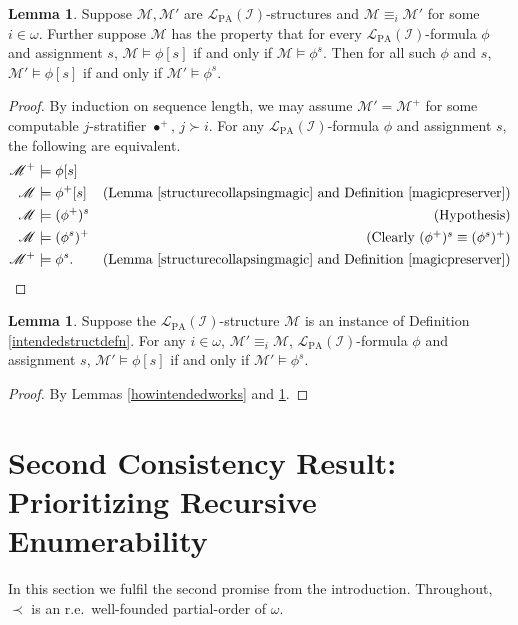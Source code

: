 \documentclass[reqno]{article}
\theoremstyle{definition}
\newtheorem{lemma}[theorem]{Lemma}
\def\L{\mathscr{L}}
\def\M{\mathscr{M}}
\def\LPA{\L_{\mathrm{PA}}}
\def\indset{\mathcal I}
\def\myequiv{\equiv}
\begin{document}
\begin{lemma}
\label{preservedintent}
Suppose $\M,\M'$ are $\LPA(\indset)$-structures
and $\M\myequiv_i\M'$ for some $i\in\omega$.
Further suppose $\M$ has the property that
for every $\LPA(\indset)$-formula $\phi$ and assignment $s$,
$\M\models\phi[s]$ if and only if $\M\models\phi^s$.
Then for all such $\phi$ and $s$,
$\M'\models\phi[s]$ if and only if $\M'\models\phi^s$.
\end{lemma}

\begin{proof}
By induction on sequence length,
we may assume $\M'=\M^+$ for some computable $j$-stratifier $\bullet^+$,
$j\succ i$.
For any $\LPA(\indset)$-formula $\phi$ and assignment $s$,
the following are equivalent.
\begin{align*}
\M^+ &\models \phi[s]\\
\M &\models \phi^+[s]
  &\mbox{(Lemma \ref{structurecollapsingmagic} and Definition \ref{magicpreserver})}\\
\M &\models (\phi^+)^s
  &\mbox{(Hypothesis)}\\
\M &\models (\phi^s)^+
  &\mbox{(Clearly $(\phi^+)^s\equiv(\phi^s)^+$)}\\
\M^+ &\models \phi^s.
  &\mbox{(Lemma \ref{structurecollapsingmagic} and Definition \ref{magicpreserver})}
\end{align*}
\end{proof}

\begin{lemma}
\label{preservedintentspecialcase}
Suppose the $\LPA(\indset)$-structure $\M$ is an instance of Definition \ref{intendedstructdefn}.
For any $i\in\omega$, $\M'\myequiv_i\M$, $\LPA(\indset)$-formula $\phi$ and assignment $s$,
$\M'\models\phi[s]$ if and only if $\M'\models\phi^s$.
\end{lemma}

\begin{proof}
By Lemmas \ref{howintendedworks} and \ref{preservedintent}.
\end{proof}

\section[Second Consistency Result: Prioritizing Recursive Enumerability]{Second Consistency Result:\\Prioritizing Recursive Enumerability}

In this section
we fulfil the second promise from the introduction.
Throughout, $\prec$ is an r.e.~well-founded partial-order of $\omega$.
\end{document}
